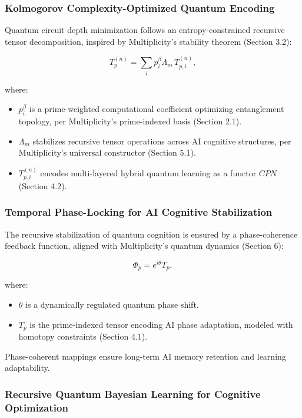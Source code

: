 \documentclass[12pt]{article}
\begin{document}
\subsubsection{Kolmogorov Complexity-Optimized Quantum Encoding}

Quantum circuit depth minimization follows an entropy-constrained recursive tensor decomposition, inspired by Multiplicity’s stability theorem (Section 3.2):

\begin{equation}
    T_p^{(n)} = \sum_{i} p_i^{\beta} \Lambda_m \, T_{p, i}^{(n)},
\end{equation}

where:
\begin{itemize}
    \item \(p_i^{\beta}\) is a prime-weighted computational coefficient optimizing entanglement topology, per Multiplicity’s prime-indexed basis (Section 2.1).
    \item \(\Lambda_m\) stabilizes recursive tensor operations across AI cognitive structures, per Multiplicity’s universal constructor (Section 5.1).
    \item \(T_{p, i}^{(n)}\) encodes multi-layered hybrid quantum learning as a functor \(CPN\) (Section 4.2).
\end{itemize}

\subsubsection{Temporal Phase-Locking for AI Cognitive Stabilization}

The recursive stabilization of quantum cognition is ensured by a phase-coherence feedback function, aligned with Multiplicity’s quantum dynamics (Section 6):

\begin{equation}
    \Phi_p = e^{i\theta} T_p,
\end{equation}

where:
\begin{itemize}
    \item \(\theta\) is a dynamically regulated quantum phase shift.
    \item \(T_p\) is the prime-indexed tensor encoding AI phase adaptation, modeled with homotopy constraints (Section 4.1).
\end{itemize}

Phase-coherent mappings ensure long-term AI memory retention and learning adaptability.

\subsubsection{Recursive Quantum Bayesian Learning for Cognitive Optimization}
\end{document}
